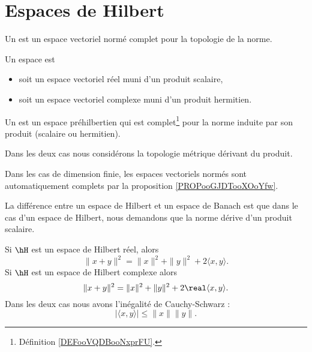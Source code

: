 
\section{Espaces de Hilbert}

\begin{definition}  \label{DefVKuyYpQ}
    Un  est un espace vectoriel normé complet pour la topologie de la norme. 
\end{definition}

\begin{definition}  \label{DefORuBdBN}
    Un espace  est
    \begin{itemize}
        \item soit un espace vectoriel réel muni d'un produit scalaire,
        \item soit un espace vectoriel complexe muni d'un produit hermitien.
    \end{itemize}
    Un  est un espace préhilbertien qui est complet\footnote{Définition \ref{DEFooVQDBooNxprFU}.} pour la norme induite par son produit (scalaire ou hermitien).

    Dans les deux cas nous considérons la topologie métrique dérivant du produit.
\end{definition}

Dans les cas de dimension finie, les espaces vectoriels normés sont automatiquement complets par la proposition \ref{PROPooGJDTooXOoYfw}.

La différence entre un espace de Hilbert et un espace de Banach est que dans le cas d'un espace de Hilbert, nous demandons que la norme dérive d'un produit scalaire.

\begin{proposition}     \label{PropTdupIG}
    Si \( \hH\) est un espace de Hilbert réel, alors
    \begin{equation}
        \| x+y \|^2=\| x \|^2+\| y \|^2+2\langle x, y\rangle .
    \end{equation}
    Si \( \hH\) est un espace de Hilbert complexe alors
    \begin{equation}        \label{EqrbBlkK}
        \| x+y \|^2=\| x \|^2+\| y \|^2+2\real\langle x, y\rangle .
    \end{equation}
    Dans les deux cas nous avons l'inégalité de Cauchy-Schwarz :
    \begin{equation}
        | \langle x, y\rangle  |\leq \| x \|\| y \|.
    \end{equation}
\end{proposition}

